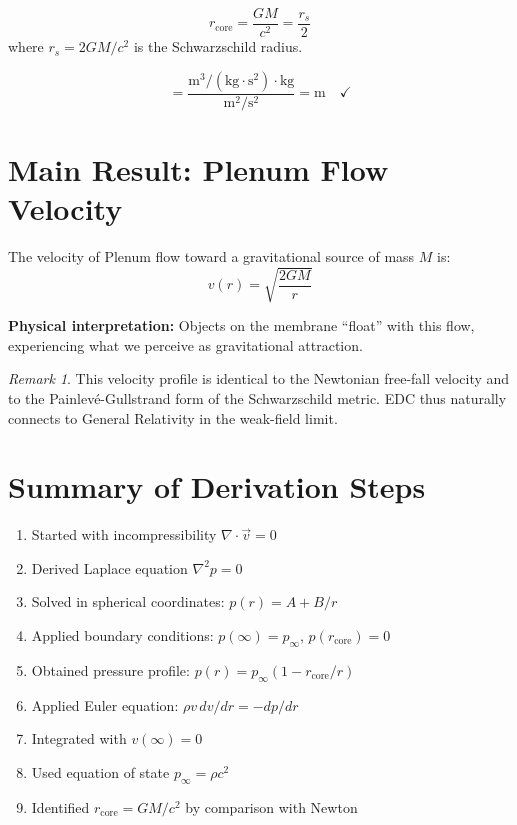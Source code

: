 \documentclass[12pt,a4paper,openany]{book}
\theoremstyle{definition}
\theoremstyle{plain}
\theoremstyle{remark}
\newtheorem{remark}{Remark}[chapter]
\newcommand{\rcore}{r_{\text{core}}}       %
\newcommand{\pinfty}{p_\infty}             %
\newcommand{\rs}{r_s}                      %
\begin{document}
\begin{derivedbox}
\begin{equation}
\boxed{\rcore = \frac{GM}{c^2} = \frac{\rs}{2}}
\label{eq:rcore_final}
\end{equation}
where $\rs = 2GM/c^2$ is the Schwarzschild radius.
\end{derivedbox}

\begin{dimcheckbox}
\begin{equation}
[\frac{GM}{c^2}] = \frac{\text{m}^3/(\text{kg}\cdot\text{s}^2) \cdot \text{kg}}{\text{m}^2/\text{s}^2} = \text{m} \quad \checkmark
\end{equation}
\end{dimcheckbox}

\section{Main Result: Plenum Flow Velocity}

\begin{derivedbox}
The velocity of Plenum flow toward a gravitational source of mass $M$ is:
\begin{equation}
\boxed{v(r) = \sqrt{\frac{2GM}{r}}}
\label{eq:v_final}
\end{equation}

\textbf{Physical interpretation:} Objects on the membrane ``float'' with this flow, experiencing what we perceive as gravitational attraction.
\end{derivedbox}

\begin{remark}
This velocity profile is identical to the Newtonian free-fall velocity and to the Painlevé-Gullstrand form of the Schwarzschild metric. EDC thus naturally connects to General Relativity in the weak-field limit.
\end{remark}

\section{Summary of Derivation Steps}

\begin{enumerate}
    \item Started with incompressibility $\nabla \cdot \vec{v} = 0$
    \item Derived Laplace equation $\nabla^2 p = 0$
    \item Solved in spherical coordinates: $p(r) = A + B/r$
    \item Applied boundary conditions: $p(\infty) = \pinfty$, $p(\rcore) = 0$
    \item Obtained pressure profile: $p(r) = \pinfty(1 - \rcore/r)$
    \item Applied Euler equation: $\rho v\,dv/dr = -dp/dr$
    \item Integrated with $v(\infty) = 0$
    \item Used equation of state $\pinfty = \rho c^2$
    \item Identified $\rcore = GM/c^2$ by comparison with Newton
\end{enumerate}
\end{document}
